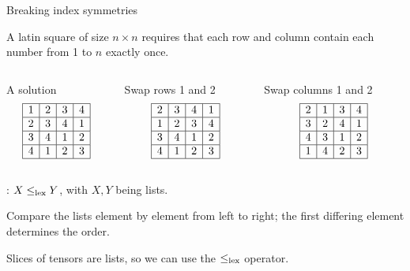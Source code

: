 \documentclass{cons-beamer}
\begin{document}
\begin{frame}{Breaking index symmetries}
  \begin{example}
    \footnotesize
    A latin square of size $n \times n$ requires that each row and column contain each number from 1 to $n$ exactly once. 
    \vfill

    \begin{columns}
      \begin{column}{0.3\textwidth}
        \centering A solution 
        \[
        \begin{array}{|c|c|c|c|}
          \hline
          1 & 2 & 3 & 4 \\
          \hline
          2 & 3 & 4 & 1 \\
          \hline
          3 & 4 & 1 & 2 \\
          \hline
          4 & 1 & 2 & 3 \\
          \hline
        \end{array}
        \]        
      \end{column}
      \begin{column}{0.3\textwidth}
        \centering Swap rows 1 and 2
        \[
        \begin{array}{|c|c|c|c|}
          \hline
          2 & 3 & 4 & 1 \\
          \hline
          1 & 2 & 3 & 4 \\
          \hline
          3 & 4 & 1 & 2 \\
          \hline
          4 & 1 & 2 & 3 \\
          \hline
        \end{array}
        \]        
      \end{column}
      \begin{column}{0.3\textwidth}
        \centering Swap columns 1 and 2
        \[
        \begin{array}{|c|c|c|c|}
          \hline
          2 & 1 & 3 & 4 \\
          \hline
          3 & 2 & 4 & 1 \\
          \hline
          4 & 3 & 1 & 2 \\
          \hline
          1 & 4 & 2 & 3 \\
          \hline
        \end{array}
        \]        
      \end{column}    
    \end{columns}
  \end{example}
  \vfill

  : $X \leq_{\textnormal{lex}} Y$, with $X,Y$ being lists. 
  \vfill

  Compare the lists element by element from left to right; the first differing element determines the order.
  \vfill

  Slices of tensors are lists, so we can use the $\leq_{\textnormal{lex}}$ operator.
\end{frame}
\end{document}
